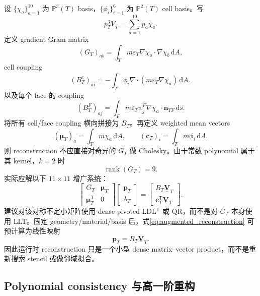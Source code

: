 \documentclass[UTF8,a4paper,11pt]{ctexart}
\newcommand{\Pp}{\mathbb{P}}
\newcommand{\dd}{\mathrm{d}}
\newcommand{\eps}{\varepsilon}
\newcommand{\vct}[1]{\bm{#1}}
\newcommand{\T}{\mathsf{T}}
\begin{document}
设 \(\{\chi_a\}_{a=1}^{10}\) 为 \(\Pp^3(T)\) basis，\(\{\phi_i\}_{i=1}^{6}\) 为 \(\Pp^2(T)\) cell basis。写
\[
p_T^3\underline V_T=\sum_{a=1}^{10}p_a\chi_a.
\]
定义 gradient Gram matrix
\begin{equation}
(G_T)_{ab}
=
\int_Tm\eps_T\nabla\chi_a\cdot\nabla\chi_b\,\dd A,
\label{eq:G_matrix}
\end{equation}
cell coupling
\begin{equation}
(B_T^c)_{ai}
=-\int_T\phi_i\nabla\cdot(m\eps_T\nabla\chi_a)\,\dd A,
\label{eq:Bc_matrix}
\end{equation}
以及每个 face 的 coupling
\begin{equation}
(B_T^F)_{aj}
=
\int_Fm\eps_T\psi_j^F\nabla\chi_a\cdot\vct n_{TF}\,\dd s.
\label{eq:Bf_matrix}
\end{equation}
将所有 cell/face coupling 横向拼接为 \(B_T\)。再定义 weighted mean vectors
\begin{equation}
(\vct\mu_T)_a=\int_Tm\chi_a\,\dd A,
\qquad
(\vct c_T)_i=\int_Tm\phi_i\,\dd A.
\label{eq:mean_vectors}
\end{equation}
则 reconstruction 不应直接对奇异的 \(G_T\) 做 Cholesky。由于常数 polynomial 属于其 kernel，\(k=2\) 时
\[
\operatorname{rank}(G_T)=9.
\]
实际应解以下 \(11\times11\) 增广系统：
\begin{equation}
\boxed{
\begin{bmatrix}
G_T & \vct\mu_T\\
\vct\mu_T^{\T} & 0
\end{bmatrix}
\begin{bmatrix}
\vct p_T\\ \lambda_T
\end{bmatrix}
=
\begin{bmatrix}
B_T\underline{\vct V}_T\\
\vct c_T^{\T}\vct V_T
\end{bmatrix}.
}
\label{eq:augmented_reconstruction}
\end{equation}
建议对该对称不定小矩阵使用 dense pivoted LDL\(^{\T}\) 或 QR，而不是对 \(G_T\) 本身使用 LLT。固定 geometry/material/basis 后，式\eqref{eq:augmented_reconstruction} 可预计算为线性映射
\begin{equation}
\boxed{
\vct p_T=R_T\underline{\vct V}_T.
}
\label{eq:R_matrix}
\end{equation}
因此运行时 reconstruction 只是一个小型 dense matrix--vector product，而不是重新搜索 stencil 或做邻域拟合。

\subsection{Polynomial consistency 与高一阶重构}
\end{document}
